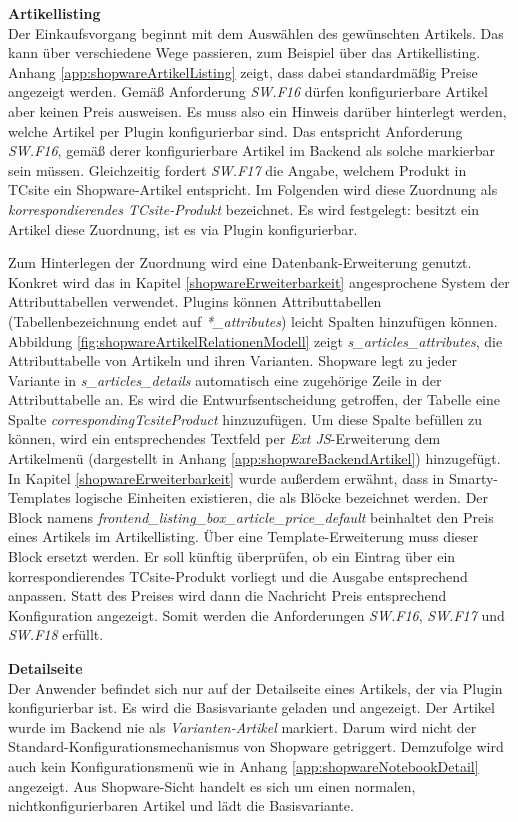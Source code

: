 \documentclass[11pt, a4paper, titlepage, listof=totoc, bibliography=totoc, index=totoc, twoside, openright, headings=normal, draft]{scrreprt}
\begin{document}
\textbf{Artikellisting}\\
Der Einkaufsvorgang beginnt mit dem Auswählen des gewünschten Artikels. Das kann über verschiedene Wege passieren, zum Beispiel über das Artikellisting. Anhang \ref{app:shopwareArtikelListing} zeigt, dass dabei standardmäßig Preise angezeigt werden. Gemäß Anforderung \emph{SW.F16} dürfen konfigurierbare Artikel aber keinen Preis ausweisen. Es muss also ein Hinweis darüber hinterlegt werden, welche Artikel per Plugin konfigurierbar sind. Das entspricht Anforderung \emph{SW.F16}, gemäß derer konfigurierbare Artikel im Backend als solche markierbar sein müssen. Gleichzeitig fordert \emph{SW.F17} die Angabe, welchem Produkt in TCsite ein Shopware-Artikel entspricht. Im Folgenden wird diese Zuordnung als \emph{korrespondierendes TCsite-Produkt} bezeichnet. Es wird festgelegt: besitzt ein Artikel diese Zuordnung, ist es via Plugin konfigurierbar.

Zum Hinterlegen der Zuordnung wird eine Datenbank-Erweiterung genutzt. Konkret wird das in Kapitel \ref{shopwareErweiterbarkeit} angesprochene System der Attributtabellen verwendet. Plugins können Attributtabellen (Tabellenbezeichnung endet auf \emph{*\_attributes}) leicht Spalten hinzufügen können. Abbildung \ref{fig:shopwareArtikelRelationenModell} zeigt \emph{s\_articles\_attributes}, die Attributtabelle von Artikeln und ihren Varianten. Shopware legt zu jeder Variante in \emph{s\_articles\_details} automatisch eine zugehörige Zeile in der Attributtabelle an. Es wird die Entwurfsentscheidung getroffen, der Tabelle eine Spalte \emph{correspondingTcsiteProduct} hinzuzufügen. Um diese Spalte befüllen zu können, wird ein entsprechendes Textfeld per \emph{Ext JS}-Erweiterung dem Artikelmenü (dargestellt in Anhang \ref{app:shopwareBackendArtikel}) hinzugefügt. In Kapitel \ref{shopwareErweiterbarkeit} wurde außerdem erwähnt, dass in Smarty-Templates logische Einheiten existieren, die als Blöcke bezeichnet werden. Der Block namens \emph{frontend\_listing\_box\_article\_price\_default} beinhaltet den Preis eines Artikels im Artikellisting.  Über eine Template-Erweiterung muss dieser Block ersetzt werden. Er soll künftig überprüfen, ob ein Eintrag über ein korrespondierendes TCsite-Produkt vorliegt und die Ausgabe entsprechend anpassen. Statt des Preises wird dann die Nachricht  \glqq Preis entsprechend Konfiguration\grqq{} angezeigt. Somit werden die Anforderungen \emph{SW.F16}, \emph{SW.F17} und \emph{SW.F18} erfüllt.

\textbf{Detailseite}\\
Der Anwender befindet sich nur auf der Detailseite eines Artikels, der via Plugin konfigurierbar ist. Es wird die Basisvariante geladen und angezeigt. Der Artikel wurde im Backend nie als \emph{Varianten-Artikel} markiert. Darum wird nicht der Standard-Konfigurationsmechanismus von Shopware getriggert. Demzufolge wird  auch kein Konfigurationsmenü wie in Anhang \ref{app:shopwareNotebookDetail} angezeigt. Aus Shopware-Sicht handelt es sich um einen normalen, nichtkonfigurierbaren Artikel und lädt die Basisvariante.
\end{document}
